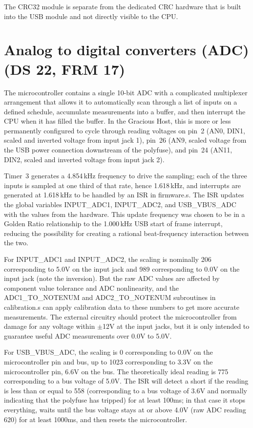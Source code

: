 The CRC32 module is separate from the dedicated CRC hardware that is built
into the USB module and not directly visible to the CPU.


\section{Analog to digital converters (ADC) (DS 22, FRM 17)}

The microcontroller contains a single 10-bit ADC with a complicated
multiplexer arrangement that allows it to automatically scan through a list
of inputs on a defined schedule, accumulate measurements into a buffer, and
then interrupt the CPU when it has filled the buffer.  In the Gracious Host,
this is more or less permanently configured to cycle through reading
voltages on pin~2 (AN0, DIN1, scaled and inverted voltage from input jack
1), pin~26 (AN9, scaled voltage from the USB power connection downstream of
the polyfuse), and pin~24 (AN11, DIN2, scaled and inverted voltage from
input jack 2).

Timer~3 generates a 4.854\,kHz frequency to drive the sampling; each of the
three inputs is sampled at one third of that rate, hence 1.618\,kHz, and
interrupts are generated at 1.618\,kHz to be handled by an ISR in firmware.s. 
The ISR updates the global variables INPUT\_ADC1, INPUT\_ADC2, and
USB\_VBUS\_ADC with the values from the hardware.  This update frequency was
chosen to be in a Golden Ratio relationship to the 1.000\,kHz USB start of
frame interrupt, reducing the possibility for creating a rational
beat-frequency interaction between the two.

For INPUT\_ADC1 and INPUT\_ADC2, the scaling is nominally 206 corresponding
to 5.0V on the input jack and 989 corresponding to 0.0V on the input jack
(note the inversion).  But the raw ADC values are affected by component
value tolerance and ADC nonlinearity, and the ADC1\_TO\_NOTENUM and
ADC2\_TO\_NOTENUM subroutines in calibration.s can apply calibration data to
these numbers to get more accurate measurements.  The external circuitry
should protect the microcontroller from damage for any voltage
within $\pm$12V at the input jacks, but it is only intended to guarantee
useful ADC measurements over 0.0V to 5.0V.

For USB\_VBUS\_ADC, the scaling is 0 corresponding to 0.0V on the
microcontroller pin and bus, up to 1023 corresponding to 3.3V on the
microcontroller pin, 6.6V on the bus.  The theoretically ideal reading is
775 corresponding to a bus voltage of 5.0V.  The ISR will detect a short if
the reading is less than or equal to 558 (corresponding to a bus voltage of
3.6V and normally indicating that the polyfuse has tripped) for at least
100ms; in that case it stops everything, waits until the bus voltage stays
at or above 4.0V (raw ADC reading 620) for at least 1000ms, and then resets
the microcontroller.

